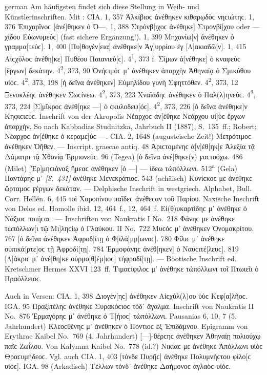 \begin{otherlanguage*}{german}
Am häufigsten findet sich diese Stellung in Weih- und Künstlerinschriften. Mit : CIA. 1, 357 Ἀλκίβιοϲ ἀνέθηκεν κιθαρῳδὸϲ νηϲιώτηϲ. 1, 376 Ἐπιχαρῖνοϲ [ἀνέ]θηκεν ὁ Ὀ—. 1, 388 Στρόνβ[ιχοϲ ἀνέθηκε] Στρονβί[χου oder — χίδου Εὐ\-ω\-νυ\-μεύϲ] (fast sichere Ergänzung!). 1, 399 Μηχανίω[ν] ἀνέθηκεν ὁ γραμμα[τεύϲ]. 1, 400 [Πυ]θογέν[εια] ἀνέθηκε[ν Ἀγ]υρρίου ἐγ [Λ]ακιαδῶ[ν]. 1, 415 Αἰϲχύλοϲ ἀνέθη[κε] Πυθέου Παιανιεύ[ϲ]. 4\textsuperscript{1}, 373 f. Σίμων ἀ[νέθηκε] ὁ κναφεὺϲ [ἔργων] δεκάτην. 4\textsuperscript{2}, 373, 90 Ὀνήϲιμόϲ μ᾽ ἀνέθηκεν ἀπαρχὴν Ἀθηναίᾳ ὁ Σμικύθου υἱόϲ. 4\textsuperscript{2}, 373, 198 [ἡ δεῖνα ἀνέθηκεν] Εὐμηλίδου γυνὴ Σφηττόθεν. 4\textsuperscript{2}, 373, 12 Ξενοκλέηϲ ἀνέθηκεν Σωϲίνεω. 4\textsuperscript{2}, 373, 223 Χναϊάδηϲ ἀνέθηκεν ὁ Παλ(λ)ηνεύϲ. 4\textsuperscript{2}, 373, 224 [Σ]μῖκροϲ ἀνέθ[ηκε —] ὁ ϲκυλοδεψ[όϲ]. 4\textsuperscript{2}, 373, 226 [ὁ δεῖνα ἀνέθηκε]ν Κηφιϲιεύϲ. Inschrift von der Akropolis Νέαρχοϲ ἀν[έθηκε Νεάρχου υἱ]ὺϲ ἔργων ἀπαρχήν. So nach Kabbadias Studnitzka, Jahrbuch II (1887), S.~135~ff.; Robert: Νέαρχοϲ ἀν[έθηκε ὁ κεραμε]ύϲ —. CIA. 2, 1648 (augusteische Zeit!) Μετρότιμοϲ ἀνέθηκεν Ὀῆθεν. — Inscript. graecae antiq. 48 Ἀριϲτομένηϲ ἀ[ν]έθ[ηκ]ε Ἀλεξία τᾷ Δάματρι τᾷ Χθονίᾳ Ἑρμιονεύϲ. 96 (Tegea) [ὁ δεῖνα ἀνέ]θηκε(ν) ϝαϲτυόχω. 486 (Milet) [Ἑρ]μηϲιάναξ ἥμεαϲ ἀνέθηκεν [ὁ —] — ίδεω τὠπόλλωνι. 512\textsuperscript{a} (Gela) Παντάρηϲ μ᾽ \hypertarget{p431}{\emph{[S.~431]}}\label{p431} ἀνέθηκε Μενεκράτιοϲ. 543 (achäisch) Κυνίϲκοϲ με ἀνέθηκε ὥρταμοϲ ϝέργων δεκάταν. — Delphische Inschrift in westgriech. Alphabet, Bull. Corr. Hellén. 6, 445 τοὶ Χαροπίνου παῖδεϲ ἀνέθεϲαν τοῦ Παρίου. Naxische Inschrift von Delos ed. Homolle ibid. 12, 464~f., 12, 464~f. Εἰ(θ)υκαρτίδηϲ μ᾽ ἀνέθηκε ὁ Νάξιοϲ ποιήϲαϲ. — Inschriften von Naukratis I No.~218 Φάνηϲ με ἀνέθηκε τὠπόλλων[ι τῷ Μι]ληϲίῳ ὁ Γλαύκου. II No.~722 Μυϲόϲ μ’ ἀνέθηκεν Ὀνομακρίτου. 767 [ὁ δεῖνα ἀνέθηκεν Ἀφροδ]ίτῃ ὁ Φ[ιλά]μμ[ωνοϲ]. 780 Φίλιϲ μ᾽ ἀνέθηκε οὑπικά[ρτε]οϲ τῇ Ἀφροδί[τῃ]. 784 Ἑρμοφάνηϲ ἀνέθ[ηκεν] ὁ Ναυ\-ϲι\-τέ[\-λευϲ]. 819 [Λ]ά\-κρι\-[τό]ϲ μ᾽ ἀνέ[θη]κε οὑρμο[θ]έμ[ιοϲ] τἠφροδί[τῃ]. — Böotische Inschrift ed. Kretschmer Hermes XXVI 123~ff. Τιμαϲίφιλοϲ μ’ ἀνέθηκε τὠπόλλωνι τοῖ Πτωιεῖι ὁ Πραόλ\-λειοϲ.

Auch in Versen: CIA. 1, 398 Διογέν[ηϲ] ἀνέθηκεν Αἰϲχύλ(λ)ου ὑὺϲ Κεφ[α]λῆοϲ. IGA. 95 Πραξιτέληϲ ἀνέθηκε Συρακόϲιοϲ τόδ᾽ ἄγαλμα. Inschrift von Naukratis II No.~876 Ἑρμαγόρηϲ μ᾽ ἀνέθηκε ὁ Τ[ήιοϲ] τὠπόλλωνι. Pausanias 6, 10, 7 (5. Jahrhundert) Κλεοϲθένηϲ μ’ ἀνέθηκεν ὁ Πόντιοϲ ἐξ Ἐπιδάμνου. Epigramm von Erythrae Kaibel No.~769 (4. Jahrhundert) [—]-θέρϲηϲ ἀνέθηκεν Ἀθηναίῃ πολιούχῳ παῖϲ Ζωΐλου. Von Kalymna Kaibel No.~778 (id.?) Νικίαϲ με ἀνέθηκε Ἀπόλλωνι υἱὸϲ Θραϲυμήδεοϲ. Vgl. auch CIA. 1, 403 [τόνδε Πυρῆϲ] ἀνέθηκε Πολυμνήϲτου φίλο[ϲ υἱόϲ]. IGA. 98 (Arkadisch) Τέλλων τόνδ᾽ ἀνέθηκε Δαήμονοϲ ἀγλαὸϲ υἱόϲ.


\end{otherlanguage*}
